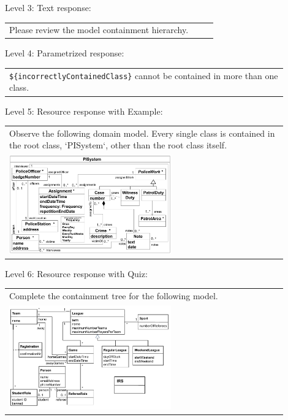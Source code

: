\noindent Level 3: Text response: \medskip

\begin{tabular}{|p{0.9\linewidth}}
Please review the model containment hierarchy.
\end{tabular} \medskip

\noindent Level 4: Parametrized response: \medskip

\begin{tabular}{|p{0.9\linewidth}}
\verb|${incorrectlyContainedClass}| cannot be contained in more than one class.
\end{tabular} \medskip

\noindent Level 5: Resource response with Example: \medskip

\begin{tabular}{|p{0.9\linewidth}}
Observe the following domain model. Every single class is contained in the 
root class, `PISystem`, other than the root class itself.

\\
\includegraphics[width=0.6\textwidth]{images/PISystem.png}
\end{tabular} \medskip

\noindent Level 6: Resource response with Quiz: \medskip

\begin{tabular}{|p{0.9\linewidth}}
Complete the containment tree for the following model.

\\
\includegraphics[width=0.6\textwidth]{images/IRS.png}
\end{tabular} \medskip


